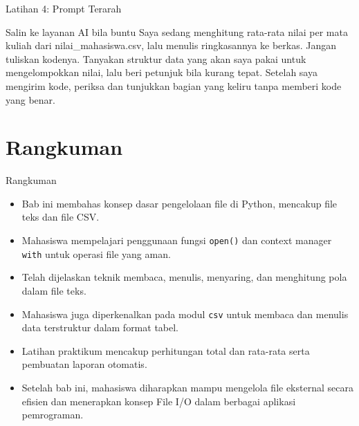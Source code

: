 \documentclass[aspectratio=169, table]{beamer}
\begin{document}
\begin{frame}{Latihan 4: Prompt Terarah}
\begin{block}{Salin ke layanan AI bila buntu}
\small Saya sedang menghitung rata-rata nilai per mata kuliah dari nilai\_mahasiswa.csv, lalu menulis ringkasannya ke berkas. Jangan tuliskan kodenya. Tanyakan struktur data yang akan saya pakai untuk mengelompokkan nilai, lalu beri petunjuk bila kurang tepat. Setelah saya mengirim kode, periksa dan tunjukkan bagian yang keliru tanpa memberi kode yang benar.
\end{block}
\end{frame}

\section{Rangkuman}

\begin{frame}{Rangkuman}
\vspace{20pt}
\begin{itemize}
  \item Bab ini membahas konsep dasar pengelolaan file di Python, mencakup file teks dan file CSV.
  \item Mahasiswa mempelajari penggunaan fungsi \texttt{open()} dan context manager \texttt{with} untuk operasi file yang aman.
  \item Telah dijelaskan teknik membaca, menulis, menyaring, dan menghitung pola dalam file teks.
  \item Mahasiswa juga diperkenalkan pada modul \texttt{csv} untuk membaca dan menulis data terstruktur dalam format tabel.
  \item Latihan praktikum mencakup perhitungan total dan rata-rata serta pembuatan laporan otomatis.
  \item Setelah bab ini, mahasiswa diharapkan mampu mengelola file eksternal secara efisien dan menerapkan konsep File I/O dalam berbagai aplikasi pemrograman.
\end{itemize}
\end{frame}
\end{document}
